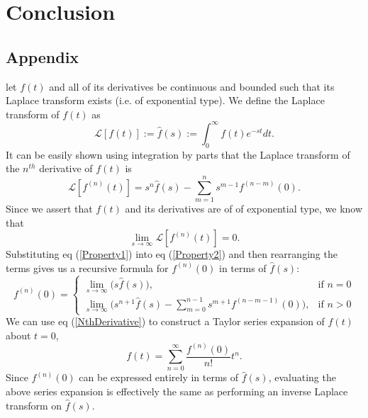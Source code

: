 \documentclass[12pt]{article}
\begin{document}
\section{Conclusion}

\subsection{Appendix}
let $f(t)$ and all of its derivatives be continuous and bounded such
that its Laplace transform exists (i.e. of exponential type).  We
define the Laplace transform of $f(t)$ as
\begin{equation}
  \mathcal{L}[f(t)] := \hat{f}(s) := \int_{0}^\infty f(t)e^{-st}dt.
\end{equation}
It can be easily shown using integration by parts that the Laplace
transform of the $n^{th}$ derivative of $f(t)$ is
\begin{equation}\label{Property1}
  \mathcal{L}[f^{(n)}(t)] = s^n\hat{f}(s) - \sum_{m=1}^ns^{m-1}f^{(n-m)}(0).
\end{equation}
Since we assert that $f(t)$ and its derivatives are of of exponential
type, we know that
\begin{equation}\label{Property2}
  \lim_{s \to \infty}\mathcal{L}[f^{(n)}(t)] = 0.
\end{equation}
Substituting eq (\ref{Property1}) into eq (\ref{Property2}) and then
rearranging the terms gives us a recursive formula for
$f^{(n)}(0)$ in terms of $\hat{f}(s)$:
\begin{equation}\label{NthDerivative}
  f^{(n)}(0) = 
  \begin{cases}
    \lim_{s \to \infty} \big( s\hat{f}(s)\big)\nonumber, &\text{if }n = 0\\
    \lim_{s \to \infty} \big( s^{n + 1}\hat{f}(s) - \sum_{m=0}^{n-1}
    s^{m+1}f^{(n-m-1)}(0)\big), &\text{if }n > 0
  \end{cases}
\end{equation}
We can use eq (\ref{NthDerivative}) to construct a Taylor series
expansion of $f(t)$ about $t=0$,
\begin{equation}
  f(t) = \sum_{n=0}^\infty\frac{f^{(n)}(0)}{n!}t^n.
\end{equation}
Since $f^{(n)}(0)$ can be expressed entirely in terms of
$\hat f(s)$, evaluating the above series expansion is effectively the
same as performing an inverse Laplace transform on $\hat f(s)$.
\end{document}
